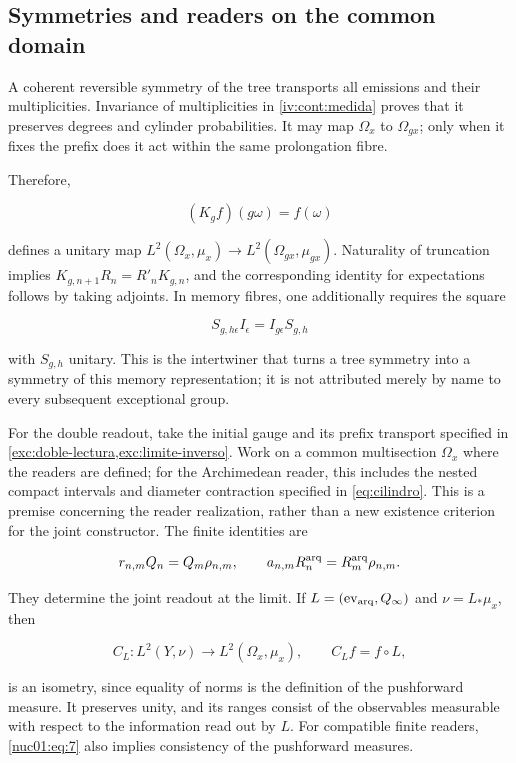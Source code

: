 \subsection{Symmetries and readers on the common domain}

A coherent reversible symmetry of the tree transports all emissions and their multiplicities. Invariance of multiplicities in \cref{iv:cont:medida} proves that it preserves degrees and cylinder probabilities. It may map \(\Omega_x\) to \(\Omega_{gx}\); only when it fixes the prefix does it act within the same prolongation fibre.

Therefore,

\[
(K_gf)(g\omega)=f(\omega)
\]

defines a unitary map \(L^2(\Omega_x,\mu_x)\to L^2(\Omega_{gx},\mu_{gx})\). Naturality of truncation implies \(K_{g,n+1}R_n=R'_nK_{g,n}\), and the corresponding identity for expectations follows by taking adjoints. In memory fibres, one additionally requires the square

\[
S_{g,h\epsilon}I_\epsilon=I_{g\epsilon}S_{g,h}
\]

with \(S_{g,h}\) unitary. This is the intertwiner that turns a tree symmetry into a symmetry of this memory representation; it is not attributed merely by name to every subsequent exceptional group.

For the double readout, take the initial gauge and its prefix transport specified in \cref{exc:doble-lectura,exc:limite-inverso}. Work on a common multisection \(\Omega_x\) where the readers are defined; for the Archimedean reader, this includes the nested compact intervals and diameter contraction specified in \eqref{eq:cilindro}. This is a premise concerning the reader realization, rather than a new existence criterion for the joint constructor. The finite identities are

\begin{equation}
r_{n,m}Q_n=Q_m\rho_{n,m},\qquad
a_{n,m}R^{\rm arq}_n=R^{\rm arq}_m\rho_{n,m}.
\label{nuc01:eq:7}
\end{equation}

They determine the joint readout at the limit. If \(L=(\operatorname{ev}_{\rm arq},Q_\infty)\) and \(\nu=L_*\mu_x\), then

\[
C_L:L^2(Y,\nu)\longrightarrow L^2(\Omega_x,\mu_x),
\qquad C_Lf=f\circ L,
\]

is an isometry, since equality of norms is the definition of the pushforward measure. It preserves unity, and its ranges consist of the observables measurable with respect to the information read out by \(L\). For compatible finite readers, \eqref{nuc01:eq:7} also implies consistency of the pushforward measures.

